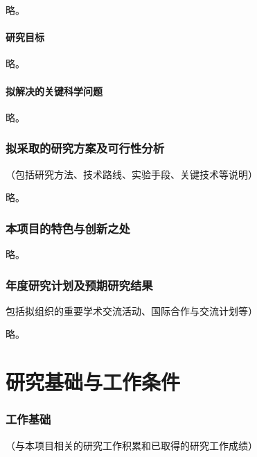 \documentclass[subfig]{mynsfc}
\begin{document}
略。

\subsection{研究目标}

略。

\subsection{拟解决的关键科学问题}

略。

\section{拟采取的研究方案及可行性分析}
\label{sec:approach}

\begin{hcomment}
  （包括研究方法、技术路线、实验手段、关键技术等说明）
\end{hcomment}

略。

\section{本项目的特色与创新之处}
\label{sec:innovation}

略。

\section{年度研究计划及预期研究结果}
\label{sec:plan}

\begin{hcomment}
  包括拟组织的重要学术交流活动、国际合作与交流计划等）
\end{hcomment}

略。

\part{研究基础与工作条件}
\label{sec:preparation}


\section{工作基础}
\label{sec:previous-work}

\begin{hcomment}
  （与本项目相关的研究工作积累和已取得的研究工作成绩）
\end{hcomment}
\end{document}
